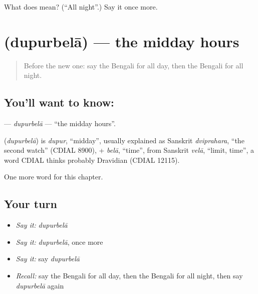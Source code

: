 \begin{tcolorbox}[breakable,colback=teal!4,colframe=teal!35!black,title={Before you move on}]
What does  mean? (\textquotedblleft{}All night\textquotedblright{}.) Say it once more.
\end{tcolorbox}
\section[\texorpdfstring{\bn{দুপুরবেলা} (dupurbelā)}{দুপুরবেলা (dupurbelā)}]{ (dupurbelā) — the midday hours}

\label{lesson:BN-C95-dupurbela}



\begin{quote}
Before the new one: say the Bengali for all day, then the Bengali for all night.
\end{quote}

\subsection*{You'll want to know: }
\textbf{} — \emph{dupurbelā} — \textquotedblleft{}the midday hours\textquotedblright{}.

\begin{cousinweb}
\textbf{} (\emph{dupurbelā}) is \emph{dupur}, \textquotedblleft{}midday\textquotedblright{}, usually explained as Sanskrit \emph{dviprahara}, \textquotedblleft{}the second watch\textquotedblright{} (CDIAL 8900), + \emph{belā}, \textquotedblleft{}time\textquotedblright{}, from Sanskrit \emph{velā}, \textquotedblleft{}limit, time\textquotedblright{}, a word CDIAL thinks probably Dravidian (CDIAL 12115).
\end{cousinweb}

\begin{grammarlens}[title={What you've built}]
One more word for this chapter.
\end{grammarlens}

\subsection*{Your turn}
\begin{itemize}
\raggedright
  \item \emph{Say it:} \emph{dupurbelā}
  \item \emph{Say it:} \emph{dupurbelā}, once more
  \item \emph{Say it:} say \emph{dupurbelā}
  \item \emph{Recall:} say the Bengali for all day, then the Bengali for all night, then say \emph{dupurbelā} again
\end{itemize}

